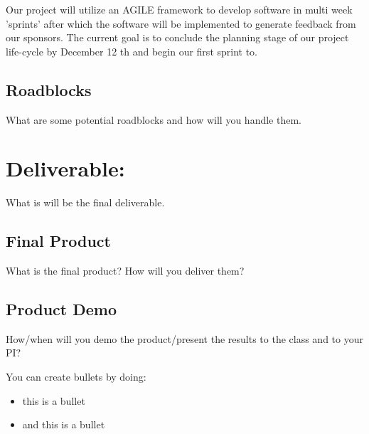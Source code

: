 \documentclass[10pt,twocolumn,letterpaper]{article}
\begin{document}
            Our project will utilize an AGILE framework to develop software in multi week 'sprints' after which the software will be implemented to generate feedback from our sponsors. The current goal is to conclude the planning stage of our project life-cycle by December 12 th and begin our first sprint to.
            
            \subsection{Roadblocks}
            
            What are some potential roadblocks and how will you handle them.
        
    	\section{Deliverable:}
        
        What is will be the final deliverable.
        
            \subsection{Final Product}
            
            What is the final product? How will you deliver them?
            
            \subsection{Product Demo}
            
            How/when will you demo the product/present the results to the class and to your PI?
        
        \noindent You can create bullets by doing:
        
        \begin{itemize}
        	\item this is a bullet
            \item and this is a bullet
        \end{itemize}
\end{document}
